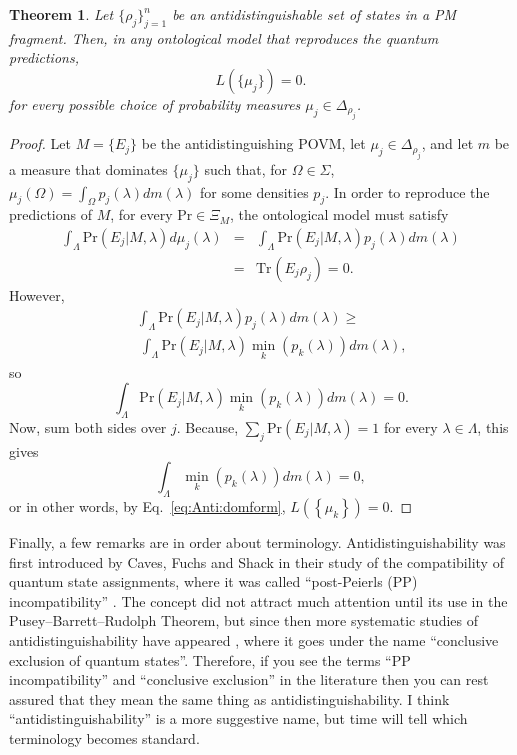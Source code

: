 \documentclass[DIV=calc,paper=a4,fontsize=11pt,twocolumn]{scrartcl} %
\theoremstyle{definition}
\theoremstyle{plain}
\newtheorem{theorem}[definition]{Theorem}
\newcommand{\Tr}[2][]{\ensuremath{\text{Tr}_{#1} \left ( #2 \right )}}
\begin{document}
\begin{theorem}
\label{thm:Anti:antiover}
Let $\{\rho_j\}_{j=1}^n$ be an antidistinguishable set of states in
a PM fragment.  Then, in any ontological model that reproduces the
quantum predictions,
\begin{equation}
L(\{\mu_j\}) = 0.
\end{equation}
for every possible choice of probability measures $\mu_j \in
\Delta_{\rho_j}$.
\end{theorem}
\begin{proof}
Let $M = \{E_j\}$ be the antidistinguishing POVM, let $\mu_j \in
\Delta_{\rho_j}$, and let $m$ be a measure that dominates
$\{\mu_j\}$ such that, for $\Omega \in \Sigma$, $\mu_j(\Omega) =
\int_{\Omega} p_j(\lambda) dm(\lambda)$ for some densities $p_j$.
In order to reproduce the predictions of $M$, for every $\text{Pr}
\in \Xi_M$, the ontological model must satisfy
\begin{eqnarray}
\int_{\Lambda} \text{Pr}(E_j|M,\lambda) d \mu_j(\lambda) & = &
\int_{\Lambda} \text{Pr}(E_j|M,\lambda) p_j(\lambda) dm(\lambda)\nonumber\\
& = & \Tr{E_j \rho_j} = 0.
\end{eqnarray}
However,
\begin{eqnarray}
&&\int_{\Lambda} \text{Pr}(E_j|M,\lambda) p_j(\lambda) dm(\lambda) \geq\nonumber\\
&&~\int_{\Lambda} \text{Pr}(E_j|M,\lambda) \min_k \left (p_k(\lambda)
\right ) dm(\lambda),
\end{eqnarray}
so
\begin{equation}
\int_{\Lambda} \text{Pr}(E_j|M,\lambda) \min_k \left (p_k(\lambda)
\right ) dm(\lambda) = 0.
\end{equation}
Now, sum both sides over $j$.  Because, $\sum_j
\text{Pr}(E_j|M,\lambda) = 1$ for every $\lambda \in \Lambda$, this
gives
\begin{equation}
\int_{\Lambda} \min_k \left ( p_k(\lambda) \right ) dm(\lambda) =
0,
\end{equation}
or in other words, by Eq.~\eqref{eq:Anti:domform}, $L \left ( \left
\{ \mu_k \right \} \right ) = 0$.
\end{proof}

Finally, a few remarks are in order about terminology.
Antidistinguishability was first introduced by Caves, Fuchs and Shack
in their study of the compatibility of quantum state assignments,
where it was called ``post-Peierls (PP) incompatibility''
\cite{Caves2002}.  The concept did not attract much attention until
its use in the Pusey--Barrett--Rudolph Theorem, but since then more systematic studies of
antidistinguishability have appeared \cite{Bandyopadhyay2013,
Perry2014}, where it goes under the name ``conclusive exclusion of
quantum states''.  Therefore, if you see the terms ``PP
incompatibility'' and ``conclusive exclusion'' in the literature then
you can rest assured that they mean the same thing as
antidistinguishability.  I think ``antidistinguishability'' is a more
suggestive name, but time will tell which terminology becomes
standard.
\end{document}
